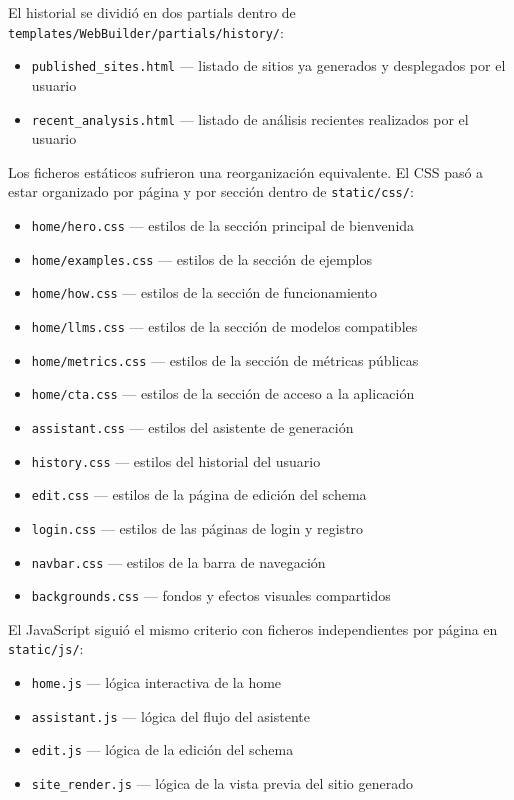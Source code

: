El historial se dividió en dos partials dentro de \texttt{templates/WebBuilder/partials/history/}:

\begin{itemize}
    \item \texttt{published\_sites.html} — listado de sitios ya generados 
    y desplegados por el usuario
    \item \texttt{recent\_analysis.html} — listado de análisis recientes 
    realizados por el usuario
\end{itemize}

Los ficheros estáticos sufrieron una reorganización equivalente. 
El CSS pasó a estar organizado por página y por sección dentro de 
\texttt{static/css/}:

\begin{itemize}
    \item \texttt{home/hero.css} — estilos de la sección principal de bienvenida
    \item \texttt{home/examples.css} — estilos de la sección de ejemplos
    \item \texttt{home/how.css} — estilos de la sección de funcionamiento
    \item \texttt{home/llms.css} — estilos de la sección de modelos compatibles
    \item \texttt{home/metrics.css} — estilos de la sección de métricas públicas
    \item \texttt{home/cta.css} — estilos de la sección de acceso a la aplicación
    \item \texttt{assistant.css} — estilos del asistente de generación
    \item \texttt{history.css} — estilos del historial del usuario
    \item \texttt{edit.css} — estilos de la página de edición del schema
    \item \texttt{login.css} — estilos de las páginas de login y registro
    \item \texttt{navbar.css} — estilos de la barra de navegación
    \item \texttt{backgrounds.css} — fondos y efectos visuales compartidos
\end{itemize}

El JavaScript siguió el mismo criterio con ficheros independientes 
por página en \texttt{static/js/}:

\begin{itemize}
    \item \texttt{home.js} — lógica interactiva de la home
    \item \texttt{assistant.js} — lógica del flujo del asistente
    \item \texttt{edit.js} — lógica de la edición del schema
    \item \texttt{site\_render.js} — lógica de la vista previa del sitio generado
\end{itemize}

